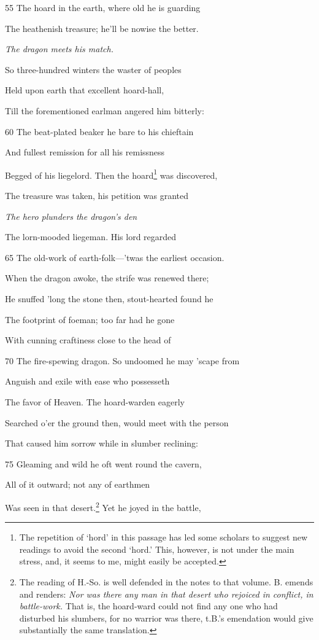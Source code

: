 55
The hoard in the earth, where old he is guarding

The heathenish treasure; he’ll be nowise the better.

\emph{The dragon meets
his match.}

So three-hundred winters the waster of peoples

Held upon earth that excellent hoard-hall,

Till the forementioned earlman angered him bitterly:

60
The beat-plated beaker he bare to his chieftain

And fullest remission for all his remissness

Begged of his liegelord. Then the hoard\footnote{The repetition of ‘hord’ in this passage has led some scholars to suggest
new readings to avoid the second ‘hord.’ This, however, is not under the
main stress, and, it seems to me, might easily be accepted.} was discovered,

The treasure was taken, his petition was granted

\emph{The hero plunders
the dragon’s den}

The lorn-mooded liegeman. His lord regarded

65
The old-work of earth-folk—’twas the earliest occasion.

When the dragon awoke, the strife was renewed there;

He snuffed ’long the stone then, stout-hearted found he

The footprint of foeman; too far had he gone

With cunning craftiness close to the head of

70
The fire-spewing dragon. So undoomed he may ’scape from

Anguish and exile with ease who possesseth

The favor of Heaven. The hoard-warden eagerly

Searched o’er the ground then, would meet with the person

That caused him sorrow while in slumber reclining:

75
Gleaming and wild he oft went round the cavern,

All of it outward; not any of earthmen

Was seen in that desert.\footnote{The reading of H.-So. is well defended in the notes to that volume. B.
emends and renders: \emph{Nor was there any man in that desert who rejoiced in
conflict, in battle-work.} That is, the hoard-ward could not find any one who
had disturbed his slumbers, for no warrior was there, t.B.’s emendation
would give substantially the same translation.} Yet he joyed in the battle,

